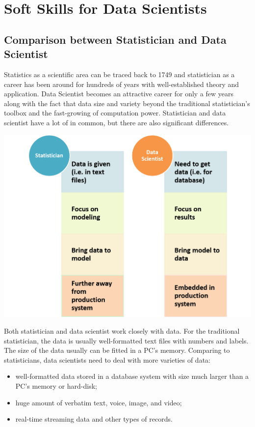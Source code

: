 \documentclass[12pt,]{krantz}
\providecommand{\tightlist}{%
  \setlength{\itemsep}{0pt}\setlength{\parskip}{0pt}}
\begin{document}
\hypertarget{soft-skills-for-data-scientists}{%
\chapter{Soft Skills for Data Scientists}\label{soft-skills-for-data-scientists}}

\hypertarget{comparison-between-statistician-and-data-scientist}{%
\section{Comparison between Statistician and Data Scientist}\label{comparison-between-statistician-and-data-scientist}}

Statistics as a scientific area can be traced back to 1749 and statistician as a career has been around for hundreds of years with well-established theory and application. Data Scientist becomes an attractive career for only a few years along with the fact that data size and variety beyond the traditional statistician's toolbox and the fast-growing of computation power. Statistician and data scientist have a lot of in common, but there are also significant differences.

\includegraphics{images/softskill1.png}

Both statistician and data scientist work closely with data. For the traditional statistician, the data is usually well-formatted text files with numbers and labels. The size of the data usually can be fitted in a PC's memory. Comparing to statisticians, data scientists need to deal with more varieties of data:

\begin{itemize}
\tightlist
\item
  well-formatted data stored in a database system with size much larger than a PC's memory or hard-disk;
\item
  huge amount of verbatim text, voice, image, and video;
\item
  real-time streaming data and other types of records.
\end{itemize}
\end{document}
